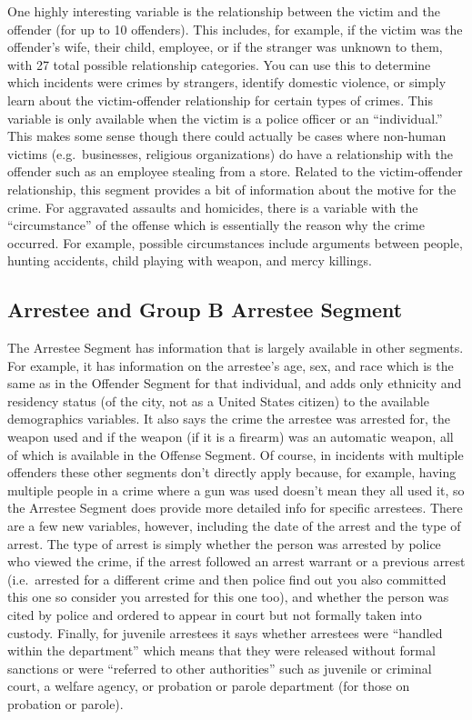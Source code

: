 \documentclass[
  12pt,
  openany]{book}
\begin{document}
One highly interesting variable is the relationship between the victim and the offender (for up to 10 offenders). This includes, for example, if the victim was the offender's wife, their child, employee, or if the stranger was unknown to them, with 27 total possible relationship categories. You can use this to determine which incidents were crimes by strangers, identify domestic violence, or simply learn about the victim-offender relationship for certain types of crimes. This variable is only available when the victim is a police officer or an ``individual.'' This makes some sense though there could actually be cases where non-human victims (e.g.~businesses, religious organizations) do have a relationship with the offender such as an employee stealing from a store. Related to the victim-offender relationship, this segment provides a bit of information about the motive for the crime. For aggravated assaults and homicides, there is a variable with the ``circumstance'' of the offense which is essentially the reason why the crime occurred. For example, possible circumstances include arguments between people, hunting accidents, child playing with weapon, and mercy killings.

\hypertarget{arrestee-and-group-b-arrestee-segment}{%
\subsection{Arrestee and Group B Arrestee Segment}\label{arrestee-and-group-b-arrestee-segment}}

The Arrestee Segment has information that is largely available in other segments. For example, it has information on the arrestee's age, sex, and race which is the same as in the Offender Segment for that individual, and adds only ethnicity and residency status (of the city, not as a United States citizen) to the available demographics variables. It also says the crime the arrestee was arrested for, the weapon used and if the weapon (if it is a firearm) was an automatic weapon, all of which is available in the Offense Segment. Of course, in incidents with multiple offenders these other segments don't directly apply because, for example, having multiple people in a crime where a gun was used doesn't mean they all used it, so the Arrestee Segment does provide more detailed info for specific arrestees. There are a few new variables, however, including the date of the arrest and the type of arrest. The type of arrest is simply whether the person was arrested by police who viewed the crime, if the arrest followed an arrest warrant or a previous arrest (i.e.~arrested for a different crime and then police find out you also committed this one so consider you arrested for this one too), and whether the person was cited by police and ordered to appear in court but not formally taken into custody. Finally, for juvenile arrestees it says whether arrestees were ``handled within the department'' which means that they were released without formal sanctions or were ``referred to other authorities'' such as juvenile or criminal court, a welfare agency, or probation or parole department (for those on probation or parole).
\end{document}
